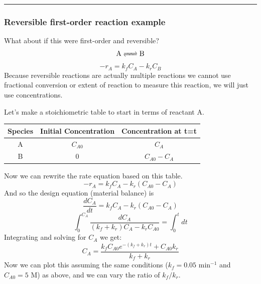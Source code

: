 \documentclass[
]{article}
\begin{document}
\begin{center}\rule{0.5\linewidth}{0.5pt}\end{center}

\hypertarget{reversible-first-order-reaction-example}{%
\subsubsection{Reversible first-order reaction example}\label{reversible-first-order-reaction-example}}

What about if this were first-order and reversible?
\[\ce{ A <=> B }\]
\[-r_A = k_fC_A - k_rC_B\]
Because reversible reactions are actually multiple reactions we cannot use fractional conversion or extent of reaction to measure this reaction, we will just use concentrations.

Let's make a stoichiometric table to start in terms of reactant A.

\begin{longtable}[]{@{}ccc@{}}
\toprule\noalign{}
Species & Initial Concentration & Concentration at t=t \\
\midrule\noalign{}
\endhead
\bottomrule\noalign{}
\endlastfoot
A & \(C_{A0}\) & \(C_A\) \\
B & \(0\) & \(C_{A0}-C_A\) \\
\end{longtable}

Now we can rewrite the rate equation based on this table.
\[-r_A = k_fC_A - k_r(C_{A0}-C_A)\]
And so the design equation (material balance) is
\[\frac{dC_A}{dt} = k_fC_A - k_r(C_{A0}-C_A)\]
\[\int_0^{C_A}\frac{dC_A}{(k_f + k_r)C_A - k_rC_{A0}} = \int_0^tdt \]
Integrating and solving for \(C_A\) we get:
\[C_A = \frac{k_fC_{A0}e^{-(k_f+k_r)t} + C_{A0}k_r}{k_f+k_r}\]
Now we can plot this assuming the same conditions (\(k_f = 0.05\text{ min}^{-1}\) and \(C_{A0} = 5\text{ M}\)) as above, and we can vary the ratio of \(k_f/k_r\).
\end{document}
